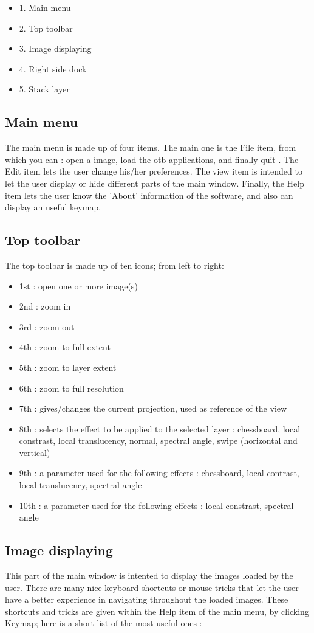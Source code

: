 \begin{itemize}
\item 1. Main menu
\item 2. Top toolbar
\item 3. Image displaying
\item 4. Right side dock
\item 5. Stack layer 
\end{itemize}

\subsection{Main menu}
The main menu is made up of four items.
The main one is the File item, from which you can : open a image, load the otb applications, and finally quit \mont.
The Edit item lets the user change his/her preferences. The view item is intended to let the user display or hide different parts of the main window.
Finally, the Help item lets the user know the 'About' information of the software, and also can display an useful keymap.

\subsection{Top toolbar}
The top toolbar is made up of ten icons; from left to right:
\begin{itemize}
\item 1st : open one or more image(s)
\item 2nd : zoom in
\item 3rd : zoom out
\item 4th : zoom to full extent
\item 5th : zoom to layer extent
\item 6th : zoom to full resolution
\item 7th : gives/changes the current projection, used as reference of the view 
\item 8th : selects the effect to be applied to the selected layer : chessboard, local constrast, local translucency, normal, spectral angle, swipe (horizontal and vertical)
\item 9th : a parameter used for the following effects : chessboard, local contrast, local translucency, spectral angle
\item 10th : a parameter used for the following effects :  local constrast, spectral angle
\end{itemize}

\subsection{Image displaying}
This part of the main window is intented to display the images loaded by the user.
There are many nice keyboard shortcuts or mouse tricks that let the user have a better experience in navigating throughout the loaded images.
These shortcuts and tricks are given within the Help item of the main menu, by clicking Keymap; here is a short list of the most useful ones :

